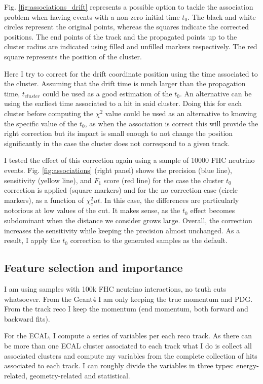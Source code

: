 Fig. \ref{fig:associations_drift} represents a possible option to tackle the association problem when having events with a non-zero initial time $t_{0}$. The black and white circles represent the original points, whereas the squares indicate the corrected positions. The end points of the track and the propagated points up to the cluster radius are indicated using filled and unfilled markers respectively. The red square represents the position of the cluster.

Here I try to correct for the drift coordinate position using the time associated to the cluster. Assuming that the drift time is much larger than the propagation time, $t_{cluster}$ could be used as a good estimation of the $t_{0}$. An alternative can be using the earliest time associated to a hit in said cluster. Doing this for each cluster before computing the $\chi^{2}$ value could be used as an alternative to knowing the specific value of the $t_{0}$, as when the association is correct this will provide the right correction but its impact is small enough to not change the position significantly in the case the cluster does not correspond to a given track.

I tested the effect of this correction again using a sample of 10000 FHC neutrino events. Fig. \ref{fig:associations} (right panel) shows the precision (blue line), sensitivity (yellow line), and $F_{1}$ score (red line) for the case the cluster $t_{0}$ correction is applied (square markers) and for the no correction case (circle markers), as a function of $\chi^{2}_cut$. In this case, the differences are particularly notorious at low values of the cut. It makes sense, as the $t_{0}$ effect becomes subdominant when the distance we consider grows large. Overall, the correction increases the sensitivity while keeping the precision almost unchanged. As a result, I apply the $t_{0}$ correction to the generated samples as the default.

\subsection{Feature selection and importance}

I am using samples with 100k FHC neutrino interactions, no truth cuts whatsoever. From the Geant4 I am only keeping the true momentum and PDG. From the track reco I keep the momentum (end momentum, both forward and backward fits).

For the ECAL, I compute a series of variables per each reco track. As there can be more than one ECAL cluster associated to each track what I do is collect all associated clusters and compute my variables from the complete collection of hits associated to each track. I can roughly divide the variables in three types: energy-related, geometry-related and statistical.

